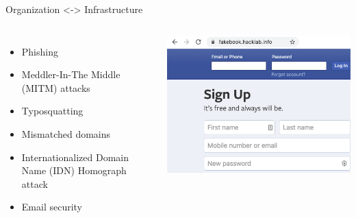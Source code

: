 \documentclass[nobackground,dvipsnames,table,aspectratio=169]{beamer}
\begin{document}
\begin{frame}{Organization <-> Infrastructure }
    \begin{columns}
            \begin{itemize}
                \item Phishing 
                \item Meddler-In-The Middle (MITM) attacks
                \item Typosquatting
                \item Mismatched domains
                \item Internationalized Domain Name (IDN) Homograph attack
                \item Email security
            \end{itemize}
            \includegraphics[width=\textwidth]{fakebook-login}
    \end{columns}
\end{frame}
\end{document}
